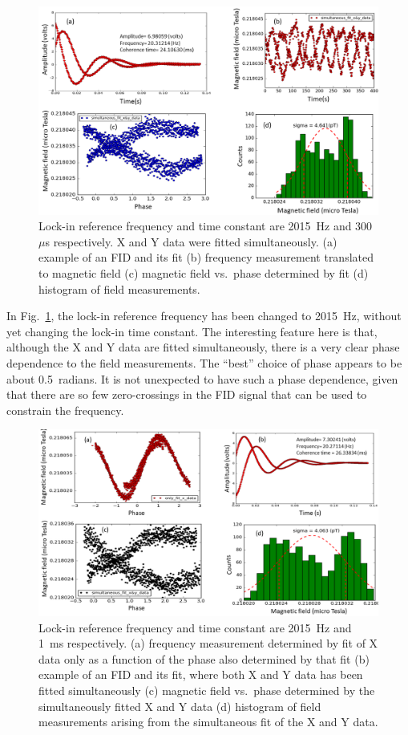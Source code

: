 \begin{figure}%
\centering\includegraphics[width=0.9\linewidth]{figures/freq_2015_simultaneous_fit_300microsec.png}
\caption{Lock-in reference frequency and time constant are 2015~Hz and
  300~$\mu$s respectively.  X and Y data were fitted simultaneously.
  (a) example of an FID and its fit (b) frequency measurement
  translated to magnetic field (c) magnetic field vs.~phase determined
  by fit (d) histogram of field
  measurements.\label{fig:freq_2015_simultaneous_fit_300_micros}}
\end{figure}

In Fig.~\ref{fig:freq_2015_simultaneous_fit_300_micros}, the lock-in
reference frequency has been changed to 2015~Hz, without yet changing
the lock-in time constant.  The interesting feature here is that,
although the X and Y data are fitted simultaneously, there is a very
clear phase dependence to the field measurements.  The ``best'' choice
of phase appears to be about 0.5~radians.  It is not unexpected to
have such a phase dependence, given that there are so few
zero-crossings in the FID signal that can be used to constrain the
frequency.

\begin{figure}%
\centering\includegraphics[width=0.9\linewidth]{figures/freq_2015_simultaneous_fit_1ms.png}
\caption{Lock-in reference frequency and time constant are 2015~Hz and
  1~ms respectively.  (a) frequency measurement determined by fit of X
  data only as a function of the phase also determined by that fit (b)
  example of an FID and its fit, where both X and Y data has been
  fitted simultaneously (c) magnetic field vs.~phase determined by the
  simultaneously fitted X and Y data (d) histogram of field
  measurements arising from the simultaneous fit of the X and Y
  data.\label{fig:freq_2015_1ms}}
\end{figure}

